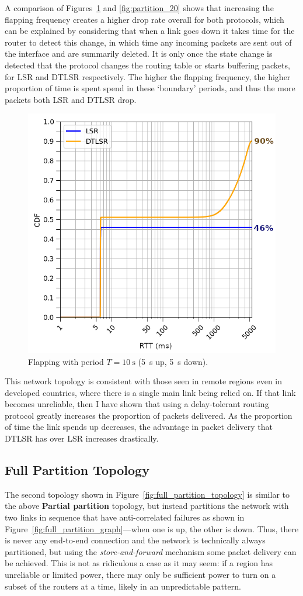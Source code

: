 \documentclass[withindex,glossary,openany]{cam-thesis}
\begin{document}
A comparison of Figures~\ref{fig:partition_5} and \ref{fig:partition_20} shows that increasing the flapping frequency creates a higher drop rate overall for both protocols, which can be explained by considering that when a link goes down it takes time for the router to detect this change, in which time any incoming packets are sent out of the interface and are summarily deleted. It is only once the state change is detected that the protocol changes the routing table or starts buffering packets, for LSR and DTLSR respectively. The higher the flapping frequency, the higher proportion of time is spent spend in these `boundary' periods, and thus the more packets both LSR and DTLSR drop.

\begin{figure}[h]
  \centering
  \includegraphics[width=0.5\linewidth]{delay_partition_flap5}
  \caption{Flapping with period $T=\SI{10}{\s}$ (\SI{5}{\s} up, \SI{5}{\s} down).}
  \label{fig:partition_5}
\end{figure}

This network topology is consistent with those seen in remote regions even in developed countries, where there is a single main link being relied on. If that link becomes unreliable, then I have shown that using a delay-tolerant routing protocol greatly increases the proportion of packets delivered. As the proportion of time the link spends up decreases, the advantage in packet delivery that DTLSR has over LSR increases drastically.


\subsection{Full Partition Topology}

The second topology shown in Figure~\ref{fig:full_partition_topology} is similar to the above \textbf{Partial partition} topology, but instead partitions the network with two links in sequence that have anti-correlated failures as shown in Figure~\ref{fig:full_partition_graph}---when one is up, the other is down. Thus, there is never any end-to-end connection and the network is technically always partitioned, but using the \textit{store-and-forward} mechanism some packet delivery can be achieved. This is not as ridiculous a case as it may seem: if a region has unreliable or limited power, there may only be sufficient power to turn on a subset of the routers at a time, likely in an unpredictable pattern.
\end{document}
